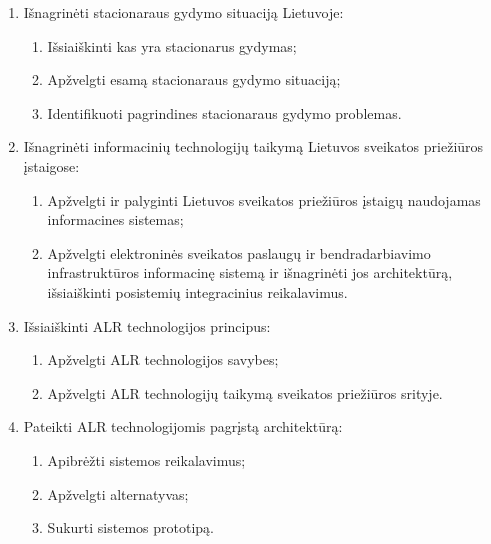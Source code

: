     \begin{enumerate}
        \item Išnagrinėti stacionaraus gydymo situaciją Lietuvoje:
        \begin{enumerate}
            \item Išsiaiškinti kas yra stacionarus gydymas;
            \item Apžvelgti esamą stacionaraus gydymo situaciją;
            \item Identifikuoti pagrindines stacionaraus gydymo problemas.
        \end{enumerate}
        \item Išnagrinėti informacinių technologijų taikymą Lietuvos sveikatos priežiūros įstaigose:
        \begin{enumerate}
            \item Apžvelgti ir palyginti Lietuvos sveikatos priežiūros įstaigų naudojamas informacines sistemas;
            \item Apžvelgti elektroninės sveikatos paslaugų ir bendradarbiavimo infrastruktūros informacinę sistemą ir išnagrinėti jos architektūrą, išsiaiškinti posistemių integracinius reikalavimus.
        \end{enumerate}
        \item Išsiaiškinti ALR technologijos principus:
        \begin{enumerate}
            \item Apžvelgti ALR technologijos savybes;
            \item Apžvelgti ALR technologijų taikymą sveikatos priežiūros srityje.
        \end{enumerate}
        \item Pateikti ALR technologijomis pagrįstą architektūrą:
        \begin{enumerate}
            \item Apibrėžti sistemos reikalavimus;
            \item Apžvelgti alternatyvas;
            \item Sukurti sistemos prototipą.
        \end{enumerate}
    \end{enumerate}

